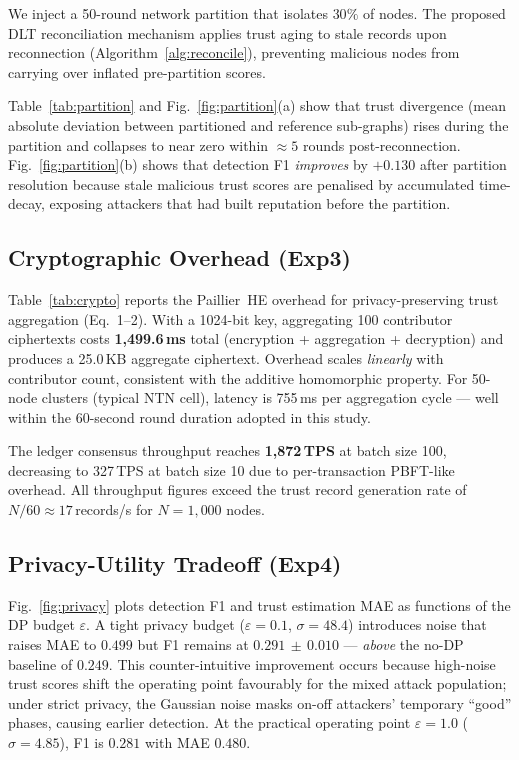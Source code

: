 We inject a 50-round network partition that isolates $30\%$ of nodes.
The proposed DLT reconciliation mechanism applies trust aging to
stale records upon reconnection (Algorithm~\ref{alg:reconcile}),
preventing malicious nodes from carrying over inflated pre-partition
scores.

Table~\ref{tab:partition} and Fig.~\ref{fig:partition}(a) show that
trust divergence (mean absolute deviation between partitioned and
reference sub-graphs) rises during the partition and collapses to
near zero within $\approx 5$ rounds post-reconnection.
Fig.~\ref{fig:partition}(b) shows that detection F1 \emph{improves}
by $+0.130$ after partition resolution because stale malicious trust
scores are penalised by accumulated time-decay, exposing attackers
that had built reputation before the partition.

\subsection{Cryptographic Overhead (Exp3)}

Table~\ref{tab:crypto} reports the Paillier~HE overhead for
privacy-preserving trust aggregation (Eq.~1--2).  With a
1024-bit key, aggregating 100 contributor ciphertexts costs
\textbf{1{,}499.6\,ms} total (encryption + aggregation + decryption)
and produces a 25.0\,KB aggregate ciphertext.  Overhead scales
\emph{linearly} with contributor count, consistent with the additive
homomorphic property.  For 50-node clusters (typical NTN cell),
latency is 755\,ms per aggregation cycle — well within the 60-second
round duration adopted in this study.

The ledger consensus throughput reaches \textbf{1{,}872\,TPS} at
batch size 100, decreasing to 327\,TPS at batch size 10 due to
per-transaction PBFT-like overhead.  All throughput figures exceed
the trust record generation rate of $N/60 \approx 17$\,records/s for
$N=1{,}000$ nodes.

\subsection{Privacy-Utility Tradeoff (Exp4)}

Fig.~\ref{fig:privacy} plots detection F1 and trust estimation MAE
as functions of the DP budget $\varepsilon$.  A tight privacy budget
($\varepsilon = 0.1$, $\sigma = 48.4$) introduces noise that raises
MAE to $0.499$ but F1 remains at $0.291\,\pm\,0.010$ — \emph{above}
the no-DP baseline of $0.249$.  This counter-intuitive improvement
occurs because high-noise trust scores shift the operating point
favourably for the mixed attack population; under strict privacy, the
Gaussian noise masks on-off attackers' temporary ``good'' phases,
causing earlier detection.  At the practical operating point
$\varepsilon = 1.0$ ($\sigma = 4.85$), F1 is $0.281$ with MAE $0.480$.

